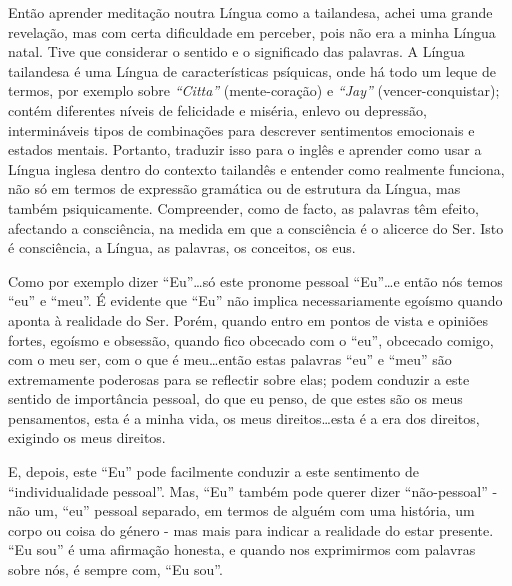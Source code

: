Então aprender meditação noutra Língua como a tailandesa, achei uma
grande revelação, mas com certa dificuldade em perceber, pois não era a
minha Língua natal. Tive que considerar o sentido e o significado das
palavras. A Língua tailandesa é uma Língua de características psíquicas,
onde há todo um leque de termos, por exemplo sobre \emph{``Citta''}
(mente-coração) e \emph{``Jay''} (vencer-conquistar); contém diferentes
níveis de felicidade e miséria, enlevo ou depressão, intermináveis tipos
de combinações para descrever sentimentos emocionais e estados mentais.
Portanto, traduzir isso para o inglês e aprender como usar a Língua
inglesa dentro do contexto tailandês e entender como realmente funciona,
não só em termos de expressão gramática ou de estrutura da Língua, mas
também psiquicamente. Compreender, como de facto, as palavras têm
efeito, afectando a consciência, na medida em que a consciência é o
alicerce do Ser. Isto é consciência, a Língua, as palavras, os
conceitos, os eus.

Como por exemplo dizer ``Eu''\ldots{}só este pronome pessoal ``Eu''\ldots{}e então
nós temos ``eu'' e ``meu''. É evidente que ``Eu'' não implica
necessariamente egoísmo quando aponta à realidade do Ser. Porém, quando
entro em pontos de vista e opiniões fortes, egoísmo e obsessão, quando
fico obcecado com o ``eu'', obcecado comigo, com o meu ser, com o que é
meu\ldots{}então estas palavras ``eu'' e ``meu'' são extremamente poderosas
para se reflectir sobre elas; podem conduzir a este sentido de
importância pessoal, do que eu penso, de que estes são os meus
pensamentos, esta é a minha vida, os meus direitos\ldots{}esta é a era dos
direitos, exigindo os meus direitos.

E, depois, este ``Eu'' pode facilmente conduzir a este sentimento de
``individualidade pessoal''. Mas, ``Eu'' também pode querer dizer
``não-pessoal'' - não um, ``eu'' pessoal separado, em termos de alguém
com uma história, um corpo ou coisa do género - mas mais para indicar a
realidade do estar presente. ``Eu sou'' é uma afirmação honesta, e
quando nos exprimirmos com palavras sobre nós, é sempre com, ``Eu sou''.

